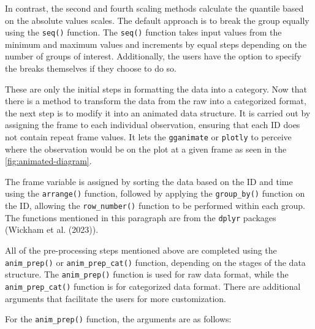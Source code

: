 In contrast, the second and fourth scaling methods calculate the quantile based on the absolute values scales. The default approach is to break the group equally using the \texttt{seq()} function. The \texttt{seq()} function takes input values from the minimum and maximum values and increments by equal steps depending on the number of groups of interest. Additionally, the users have the option to specify the breaks themselves if they choose to do so.

These are only the initial steps in formatting the data into a category. Now that there is a method to transform the data from the raw into a categorized format, the next step is to modify it into an animated data structure. It is carried out by assigning the frame to each individual observation, ensuring that each ID does not contain repeat frame values. It lets the \texttt{gganimate} or \texttt{plotly} to perceive where the observation would be on the plot at a given frame as seen in the \ref{fig:animated-diagram}.

The frame variable is assigned by sorting the data based on the ID and time using the \texttt{arrange()} function, followed by applying the \texttt{group\_by()} function on the ID, allowing the \texttt{row\_number()} function to be performed within each group. The functions mentioned in this paragraph are from the \texttt{dplyr} packages (Wickham et al. (2023)).

All of the pre-processing steps mentioned above are completed using the \texttt{anim\_prep()} or \texttt{anim\_prep\_cat()} function, depending on the stages of the data structure. The \texttt{anim\_prep()} function is used for raw data format, while the \texttt{anim\_prep\_cat()} function is for categorized data format. There are additional arguments that facilitate the users for more customization.

For the \texttt{anim\_prep()} function, the arguments are as follows:

